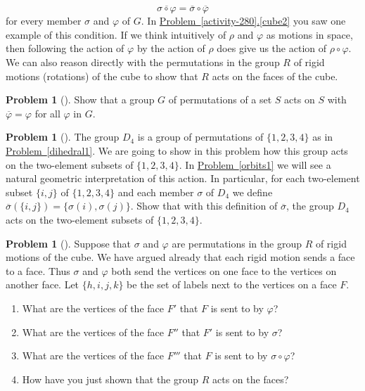 \documentclass[10pt,]{book}
\theoremstyle{plain}
\theoremstyle{definition}
\newtheorem{activity}[project]{Problem}
\theoremstyle{definition}
\numberwithin{equation}{chapter}
\begin{document}
\begin{equation*}
\overline{\sigma\circ\varphi} = \overline{\sigma}\circ\overline{\varphi}
\end{equation*}
for every member \(\sigma\) and \(\varphi\) of \(G\). In \hyperref[cube2]{Problem~\ref{activity-280}.\ref{cube2}} you saw one example of this condition. If we think intuitively of \(\rho\) and \(\varphi\) as motions in space, then following the action of \(\varphi\) by the action of \(\rho\) does give us the action of \(\rho\circ \varphi\). We can also reason directly with the permutations in the group \(R\) of rigid motions (rotations) of the cube to show that \(R\) acts on the faces of the cube.%
\begin{activity}[]\marginsymbol[-1em]{} \label{activity-281}
\hypertarget{p-1598}{}%
Show that a group \(G\) of permutations of a set \(S\) acts on \(S\) with \(\overline{\varphi} = \varphi\) for all \(\varphi\) in \(G\).%
\end{activity}
\begin{activity}[] \label{D_4on2-sets}
\hypertarget{p-1600}{}%
The group \(D_4\) is a group of permutations of \(\{1,2,3,4\}\) as in \hyperref[dihedral1]{Problem~\ref{dihedral1}}. We are going to show in this problem how this group acts on the two-element subsets of \(\{1,2,3,4\}\). In \hyperref[orbits1]{Problem~\ref{orbits1}} we will see a natural geometric interpretation of this action. In particular, for each two-element subset \(\{i,j\}\) of \(\{1,2,3,4\}\) and each member \(\sigma\) of \(D_4\) we define \(\overline{\sigma}(\{i,j\}) = \{\sigma(i),\sigma(j)\}\).  Show that with this definition of \(\overline{\sigma}\), the group \(D_4\) acts on the two-element subsets of \(\{1,2,3,4\}\).%
\end{activity}
\begin{activity}[] \label{activity-283}
\hypertarget{p-1603}{}%
Suppose that \(\sigma\) and \(\varphi\) are permutations in the group \(R\) of rigid motions of the cube. We have argued already that each rigid motion sends a face to a face. Thus \(\sigma\) and \(\varphi\) both send the vertices on one face to the vertices on another face. Let \(\{h,i,j,k\}\) be the set of labels next to the vertices on a face \(F\).%
\begin{enumerate}[font=\bfseries,label=(\alph*),ref=\alph*]
\item\label{task-208} \marginsymbol[-2.5em]{} \hypertarget{p-1604}{}%
What are the vertices of the face \(F'\) that \(F\) is sent to by \(\varphi\)?%
\item\label{task-209} \marginsymbol[-2.5em]{} \hypertarget{p-1606}{}%
What are the vertices of the face \(F''\) that \(F'\) is sent to by \(\sigma\)?%
\item\label{task-210} \marginsymbol[-2.5em]{} \hypertarget{p-1608}{}%
What are the vertices of the face \(F'''\) that \(F\) is sent to by \(\sigma\circ\varphi\)?%
\item\label{task-211} \marginsymbol[-2.5em]{} \hypertarget{p-1610}{}%
How have you just shown that the group \(R\) acts on the faces?%
\end{enumerate}
\end{activity}
\end{document}
